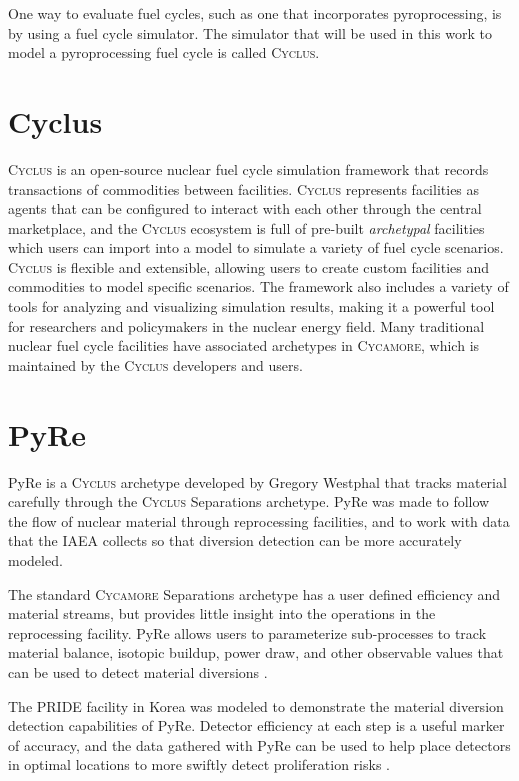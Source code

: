 \documentclass{anstrans}
\newcommand{\cycamore}{\textsc{Cycamore}\xspace}
\newcommand{\cyclus}{\textsc{Cyclus}\xspace}
\begin{document}
One way to evaluate fuel cycles, such as one that incorporates pyroprocessing, is by using a fuel cycle simulator. The simulator that will be used in this work to model a pyroprocessing fuel cycle is called \cyclus.

\section{Cyclus}
\label{sec:cyclus}
\cyclus \cite{huff_cyclus_intro_2016} is an open-source nuclear fuel cycle simulation framework that records transactions of commodities between facilities. \cyclus represents facilities as agents that can be configured to interact with each other through the central marketplace, and the \cyclus ecosystem is full of pre-built \textit{archetypal} facilities which users can import into a model to simulate a variety of fuel cycle scenarios. \cyclus is flexible and extensible, allowing users to create custom facilities and commodities to model specific scenarios. The framework also includes a variety of tools for analyzing and visualizing simulation results, making it a powerful tool for researchers and policymakers in the nuclear energy field. Many traditional nuclear fuel cycle facilities have associated archetypes in \cycamore \cite{Carlsen_cycamore_2014}, which is maintained by the \cyclus developers and users.

\section{PyRe}
PyRe is a \cyclus archetype developed by Gregory Westphal that tracks material carefully through the \cyclus Separations archetype. PyRe was made to follow the flow of nuclear material through reprocessing facilities, and to work with data that the IAEA collects so that diversion detection can be more accurately modeled. 

The standard \cycamore Separations archetype has a user defined efficiency and material streams, but provides little insight into the operations in the reprocessing facility. PyRe allows users to parameterize sub-processes to track material balance, isotopic buildup, power draw, and other observable values that can be used to detect material diversions \cite{westphal_modeling_2019}.

The PRIDE facility in Korea was modeled to demonstrate the material diversion detection capabilities of PyRe. Detector efficiency at each step is a useful marker of accuracy, and the data gathered with PyRe can be used to help place detectors in optimal locations to more swiftly detect proliferation risks \cite{westphal_pyre_2018}.
\end{document}
